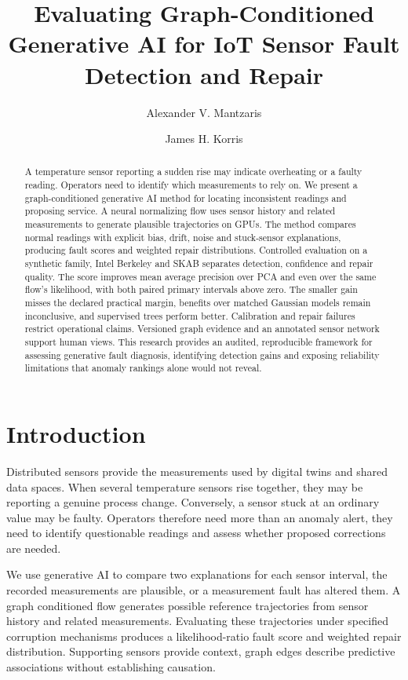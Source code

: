 \documentclass{llncs}
\title{Evaluating Graph-Conditioned Generative AI for IoT Sensor Fault Detection and Repair}
\author{Alexander V. Mantzaris\inst{1} \and James H. Korris\inst{2}}
\institute{School of Data, Mathematical and Statistical Sciences\\
University of Central Florida\\
Orlando, FL, USA\\
\email{alexander.mantzaris@ucf.edu}
\and Creative Technologies Inc.\\
Hollywood, CA, USA\\
\email{james.korris@cretecinc.com}}
\newcommand{\1}{\mathbf{1}}
\begin{document}
\maketitle
\begin{abstract}
A temperature sensor reporting a sudden rise may indicate overheating or a faulty reading. Operators need to identify which measurements to rely on. We present a graph-conditioned generative AI method for locating inconsistent readings and proposing service. A neural normalizing flow uses sensor history and related measurements to generate plausible trajectories on GPUs. The method compares normal readings with explicit bias, drift, noise and stuck-sensor explanations, producing fault scores and weighted repair distributions. Controlled evaluation on a synthetic family, Intel Berkeley and SKAB separates detection, confidence and repair quality. The score improves mean average precision over PCA and even over the same flow's likelihood, with both paired primary intervals above zero. The smaller gain misses the declared practical margin, benefits over matched Gaussian models remain inconclusive, and supervised trees perform better. Calibration and repair failures restrict operational claims. Versioned graph evidence and an annotated sensor network support human views. This research provides an audited, reproducible framework for assessing generative fault diagnosis, identifying detection gains and exposing reliability limitations that anomaly rankings alone would not reveal.
\end{abstract}



\section{Introduction}
Distributed sensors provide the measurements used by digital twins and shared data spaces. When several temperature sensors rise together, they may be reporting a genuine process change. Conversely, a sensor stuck at an ordinary value may be faulty. Operators therefore need more than an anomaly alert, they need to identify questionable readings and assess whether proposed corrections are needed.

We use generative AI to compare two explanations for each sensor interval, the recorded measurements are plausible, or a measurement fault has altered them. A graph conditioned flow generates possible reference trajectories from sensor history and related measurements. Evaluating these trajectories under specified corruption mechanisms produces a likelihood-ratio fault score and weighted repair distribution. Supporting sensors provide context, graph edges describe predictive associations without establishing causation.
\end{document}
